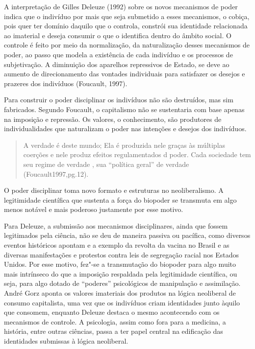 A interpretação de Gilles Deleuze (1992) sobre os novos mecanismos de
poder indica que o indivíduo por mais que seja submetido a esses
mecanismos, o cobiça, pois quer ter domínio daquilo que o controla,
constrói sua identidade relacionada ao imaterial e deseja consumir o que
o identifica dentro do âmbito social. O controle é feito por meio da
normalização, da naturalização desses mecanismos de poder, ao passo que
modela a existência de cada indivíduo e os processos de subjetivação. A
diminuição dos aparelhos repressivos de Estado, se deve ao aumento de
direcionamento das vontades individuais para satisfazer os desejos e
prazeres dos indivíduos (Foucault, 1997).

Para construir o poder disciplinar os indivíduos não são destruídos,
mas sim fabricados. Segundo Foucault, o capitalismo não se sustentaria
com base apenas na imposição e repressão. Os valores, o conhecimento,
são produtores de individualidades que naturalizam o poder nas intenções
e desejos dos indivíduos.

\begin{quote}
A verdade é deste mundo; Ela é produzida nele graças às múltiplas
coerções e nele produz efeitos regulamentados d poder. Cada sociedade
tem seu regime de verdade , sua ``política geral'' de verdade
(Foucault1997,pg.12).
\end{quote}

O poder disciplinar toma novo formato e estruturas no neoliberalismo. A
legitimidade científica que sustenta a força do biopoder se transmuta em
algo menos notável e mais poderoso justamente por esse motivo.

Para Deleuze, a submissão aos mecanismos disciplinares, ainda que fossem
legitimados pela ciência, não se deu de maneira passiva ou pacífica,
como diversos eventos históricos apontam e a exemplo da revolta da
vacina no Brasil e as diversas manifestações e protestos contra leis de
segregação racial nos Estados Unidos. Por esse motivo, fez"-se a
transmutação do biopoder para algo muito mais intrínseco do que a
imposição respaldada pela legitimidade científica, ou seja, para algo
dotado de ``poderes'' psicológicos de manipulação e assimilação. André
Gorz aponta os valores imateriais dos produtos na lógica neoliberal de
consumo capitalista, uma vez que os indivíduos criam identidades junto
àquilo que consomem, enquanto Deleuze destaca o mesmo acontecendo com os
mecanismos de controle. A psicologia, assim como fora para a medicina, a
história, entre outras ciências, passa a ter papel central na edificação
das identidades submissas à lógica neoliberal.

